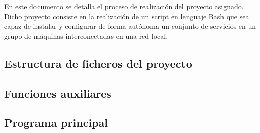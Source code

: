 En este documento se detalla el proceso de realización del proyecto asignado. Dicho proyecto consiste en la realización de un script\cite{enunciado} en lenguaje Bash que sea capaz de instalar y configurar de forma autónoma un conjunto de servicios en un grupo de máquinas interconectadas en una red local.

\subsection{Estructura de ficheros del proyecto}


\subsection{Funciones auxiliares}


\subsection{Programa principal}
